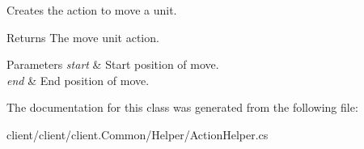 Creates the action to move a unit. 

\begin{DoxyReturn}{Returns}
The move unit action.
\end{DoxyReturn}

\begin{DoxyParams}{Parameters}
{\em start} & Start position of move.\\
\hline
{\em end} & End position of move.\\
\hline
\end{DoxyParams}


The documentation for this class was generated from the following file\+:\begin{DoxyCompactItemize}
\item 
client/client/client.\+Common/\+Helper/Action\+Helper.\+cs\end{DoxyCompactItemize}
